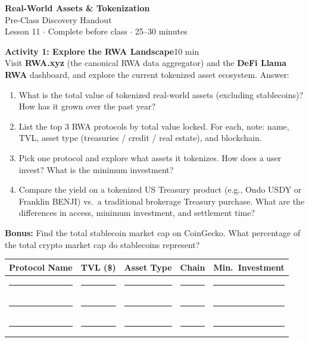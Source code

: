 \documentclass[11pt,a4paper]{article}
\newcommand{\activitybox}[3]{%
  \noindent\colorbox{mllavender4}{\parbox{\dimexpr\linewidth-2\fboxsep}{%
    \textbf{\color{mlpurple}#1}\hfill\textcolor{mlgray}{\small #2}\\[2pt]#3%
  }}\par\vspace{4pt}%
}
\newcommand{\fillcell}{\rule{2.2cm}{0.3pt}}
\begin{document}
\begin{center}
{\LARGE\color{mlpurple}\textbf{Real-World Assets \& Tokenization}}\\[4pt]
{\large\color{mlblue}Pre-Class Discovery Handout}\\[2pt]
{\small\color{mlgray}Lesson 11 $\cdot$ Complete before class $\cdot$ 25--30 minutes}
\end{center}
\vspace{4pt}

\activitybox{Activity 1: Explore the RWA Landscape}{10 min}{%
Visit \textbf{RWA.xyz} (the canonical RWA data aggregator) and the \textbf{DeFi Llama RWA} dashboard, and explore the current tokenized asset ecosystem. Answer:
\begin{enumerate}
\item What is the total value of tokenized real-world assets (excluding stablecoins)? How has it grown over the past year?
\item List the top 3 RWA protocols by total value locked. For each, note: name, TVL, asset type (treasuries / credit / real estate), and blockchain.
\item Pick one protocol and explore what assets it tokenizes. How does a user invest? What is the minimum investment?
\item Compare the yield on a tokenized US Treasury product (e.g., Ondo USDY or Franklin BENJI) vs.\ a traditional brokerage Treasury purchase. What are the differences in access, minimum investment, and settlement time?
\end{enumerate}
\textbf{Bonus:} Find the total stablecoin market cap on CoinGecko. What percentage of the total crypto market cap do stablecoins represent?
\vspace{4pt}
{\footnotesize\renewcommand{\arraystretch}{1.35}%
\setlength{\tabcolsep}{5pt}%
\begin{tabular}{@{}lllll@{}}
\toprule
\textbf{Protocol Name} & \textbf{TVL (\$)} & \textbf{Asset Type} & \textbf{Chain} & \textbf{Min.\ Investment} \\
\midrule
\fillcell & \fillcell & \fillcell & \fillcell & \fillcell \\
\fillcell & \fillcell & \fillcell & \fillcell & \fillcell \\
\fillcell & \fillcell & \fillcell & \fillcell & \fillcell \\
\bottomrule
\end{tabular}}
\vspace{2pt}
}
\end{document}
